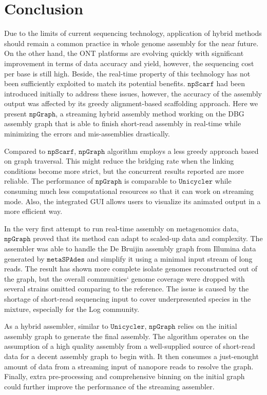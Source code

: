 \documentclass[10pt,twocolumn,twoside]{genpaper}
\newcommand{\npscarf}{$\mathtt{npScarf}$}
\newcommand{\npgraph}{$\mathtt{npGraph}$}
\newcommand{\unicycler}{$\mathtt{Unicycler}$}
\begin{document}
\section*{Conclusion}
Due to the limits of current sequencing technology, application of hybrid methods should remain a common practice in whole genome assembly for the near future.
On the other hand, the ONT platforms are evolving quickly with significant improvement in terms of data accuracy and yield, however, the sequencing cost per base is still high. Beside, the real-time property of this technology has not been sufficiently exploited to match its potential benefits.
\npscarf{} had been introduced initially to address these issues, however, the accuracy of the assembly output was affected by its greedy alignment-based scaffolding approach.
Here we present \npgraph{}, a streaming hybrid assembly method working on the DBG assembly graph that is able to finish short-read assembly in real-time while minimizing the errors and mis-assemblies drastically.

Compared to \npscarf, \npgraph{} algorithm employs a less greedy approach based on graph traversal. This might reduce the bridging rate when the linking conditions become more strict, but the concurrent results reported are more reliable.
The performance of \npgraph{} is comparable to \unicycler{} while consuming much less computational resources so that it can work on streaming mode. 
Also, the integrated GUI allows users to visualize its animated output in a  more efficient way.

In the very first attempt to run real-time assembly on metagenomics data, \npgraph{} proved that its method can adapt to scaled-up data and complexity. The assembler was able to handle the De Bruijin assembly graph from Illumina data generated by $\mathtt{metaSPAdes}$ and simplify it using a minimal input stream of long reads. 
The result has shown more complete isolate genomes reconstructed out of the graph, but the overall communities` genome coverage were dropped with several strains omitted comparing to the reference. The issue is caused by the shortage of short-read sequencing input to cover underpresented species in the mixture, especially for the Log community.

As a hybrid assembler, similar to \unicycler{}, \npgraph{} relies on the initial assembly graph to generate the final assembly. The algorithm operates on the assumption of a high quality assembly from a well-supplied source of short-read data for a decent assembly graph to begin with.
It then consumes a just-enought amount of data from a streaming input of nanopore reads to resolve the graph. 
Finally, extra pre-processing and comprehensive binning on the initial graph could further improve the performance of the streaming assembler.
\end{document}
